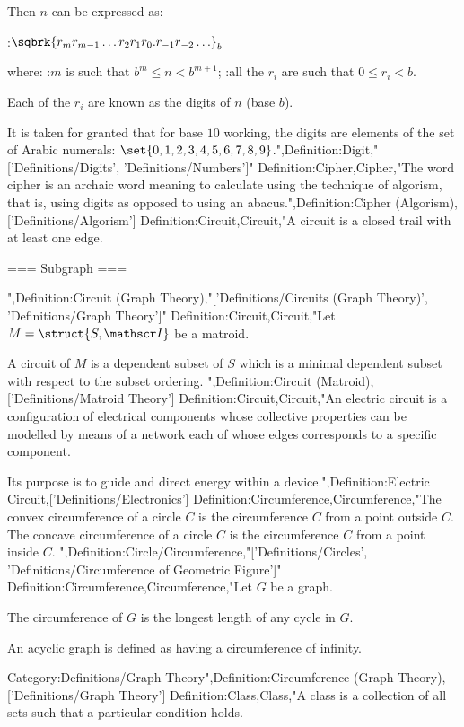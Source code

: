 Then $n$ can be expressed as:

:$\sqbrk {r_m r_{m - 1} \ldots r_2 r_1 r_0 . r_{-1} r_{-2} \ldots}_b$

where:
:$m$ is such that $b^m \le n < b^{m + 1}$;
:all the $r_i$ are such that $0 \le r_i < b$.

Each of the $r_i$ are known as the digits of $n$ (base $b$).


It is taken for granted that for base $10$ working, the digits are elements of the set of Arabic numerals: $\set {0, 1, 2, 3, 4, 5, 6, 7, 8, 9}$.",Definition:Digit,"['Definitions/Digits', 'Definitions/Numbers']"
Definition:Cipher,Cipher,"The word cipher is an archaic word meaning to calculate using the technique of algorism, that is, using digits as opposed to using an abacus.",Definition:Cipher (Algorism),['Definitions/Algorism']
Definition:Circuit,Circuit,"A circuit is a closed trail with at least one edge.


=== Subgraph ===

",Definition:Circuit (Graph Theory),"['Definitions/Circuits (Graph Theory)', 'Definitions/Graph Theory']"
Definition:Circuit,Circuit,"Let $M = \struct {S, \mathscr I}$ be a matroid.


A circuit of $M$ is a dependent subset of $S$ which is a minimal dependent subset with respect to the subset ordering.
",Definition:Circuit (Matroid),['Definitions/Matroid Theory']
Definition:Circuit,Circuit,"An electric circuit is a configuration of electrical components whose collective properties can be modelled by means of a network each of whose edges corresponds to a specific component.

Its purpose is to guide and direct energy within a device.",Definition:Electric Circuit,['Definitions/Electronics']
Definition:Circumference,Circumference,"The convex circumference of a circle $C$ is the circumference $C$ from a point outside $C$.
The concave circumference of a circle $C$ is the circumference $C$ from a point inside $C$.
",Definition:Circle/Circumference,"['Definitions/Circles', 'Definitions/Circumference of Geometric Figure']"
Definition:Circumference,Circumference,"Let $G$ be a graph.

The circumference of $G$ is the longest length of any cycle in $G$.


An acyclic graph is defined as having a circumference of infinity.

Category:Definitions/Graph Theory",Definition:Circumference (Graph Theory),['Definitions/Graph Theory']
Definition:Class,Class,"A class is a collection of all sets such that a particular condition holds.



